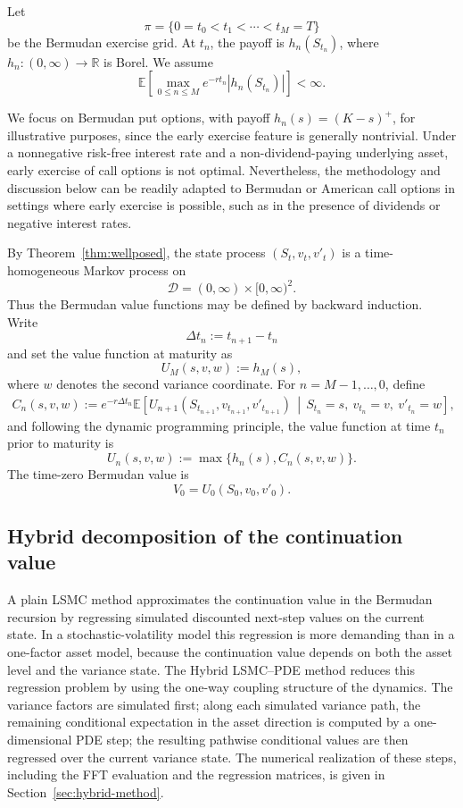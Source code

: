 \documentclass[pdflatex,sn-mathphys-num]{sn-jnl}
\theoremstyle{thmstyleone}%
\theoremstyle{thmstylethree}%
\theoremstyle{thmstyletwo}%
\newcommand{\E}{\mathbb E}
\newcommand{\R}{\mathbb R}
\begin{document}
Let
$$
\pi=\{0=t_0<t_1<\cdots<t_M=T\}
$$
be the Bermudan exercise grid. At $t_n$, the payoff is $h_n(S_{t_n})$, where
$h_n:(0,\infty)\to\R$ is Borel. We assume
$$
\E\!\left[
\max_{0\le n\le M}e^{-rt_n}|h_n(S_{t_n})|
\right]<\infty .
$$


We focus on Bermudan put options, with payoff $h_n(s)=(K-s)^+$, for illustrative purposes, since the early exercise feature is generally nontrivial.  Under a nonnegative risk-free interest rate and a non-dividend-paying underlying asset, early exercise of call options is not optimal. Nevertheless, the methodology and discussion below can be readily adapted to Bermudan or American call options in settings where early exercise is possible, such as in the presence of dividends or negative interest rates. 


By Theorem~\ref{thm:wellposed}, the state process
$(S_t,v_t,v'_t)$ is a time-homogeneous Markov process on
$$
\mathcal D=(0,\infty)\times[0,\infty)^2 .
$$
Thus the Bermudan value functions may be defined by backward induction. Write
$$
\Delta t_n:=t_{n+1}-t_n
$$
and set the value function at maturity as
$$
U_M(s,v,w):=h_M(s),
$$
where $w$ denotes the second variance coordinate. For $n=M-1,\ldots,0$, define
$$
\begin{aligned}
C_n(s,v,w)
:=
e^{-r\Delta t_n}
\E\!\left[
U_{n+1}(S_{t_{n+1}},v_{t_{n+1}},v'_{t_{n+1}})
\,\middle|\,
S_{t_n}=s,\ v_{t_n}=v,\ v'_{t_n}=w
\right],
\end{aligned}
$$
and following the dynamic programming principle, the value function at time $t_n$ prior to maturity is
$$
U_n(s,v,w):=\max\{h_n(s),C_n(s,v,w)\}.
$$
The time-zero Bermudan value is
$$
V_0=U_0(S_0,v_0,v'_0).
$$

\subsection{Hybrid decomposition of the continuation value}\label{sec:hybrid-overview}

A plain LSMC method approximates the continuation value in the Bermudan recursion
by regressing simulated discounted next-step values on the current state. In a
stochastic-volatility model this regression is more demanding than in a one-factor
asset model, because the continuation value depends on both the asset level and the
variance state. The Hybrid LSMC--PDE method reduces this regression problem by
using the one-way coupling structure of the dynamics. The variance factors are simulated
first; along each simulated variance path, the remaining conditional expectation in
the asset direction is computed by a one-dimensional PDE step; the resulting
pathwise conditional values are then regressed over the current variance state. The
numerical realization of these steps, including the FFT evaluation and the regression
matrices, is given in Section~\ref{sec:hybrid-method}.
\end{document}
